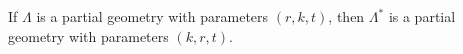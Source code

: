 If $\Lambda$ is a partial geometry with parameters $(r, k, t)$, then $\Lambda^*$ is a partial geometry with parameters $(k, r, t)$.
